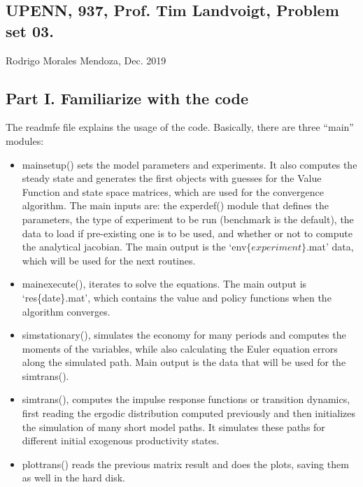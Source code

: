 \documentclass{article}
\begin{document}
\subsection*{UPENN, 937, Prof. Tim Landvoigt, Problem set 03.}

\begin{par}
Rodrigo Morales Mendoza, Dec. 2019
\end{par} \vspace{1em}


\subsection*{Part I. Familiarize with the code}

The readmfe file explains the usage of the code. Basically, there are three ``main'' modules:

\begin{itemize}
	\item main\textunderscore setup() sets the model parameters and experiments. It also computes the steady state and generates the first objects with guesses for the Value Function and state space matrices, which are used for the convergence algorithm. The main inputs are: the experdef() module that defines the parameters, the type of experiment to be run (benchmark is the default), the data to load if pre-existing one is to be used, and whether or not to compute the analytical jacobian. The main output is the `env\textunderscore$\{experiment\}$.mat' data, which will be used for the next routines. 
	\item main\textunderscore execute(), iterates to solve the equations. The main output is `res\textunderscore\{date\}.mat', which contains the value and policy functions when the algorithm converges.
	\item sim\textunderscore stationary(), simulates the economy for many periods and computes the moments of the variables, while also calculating the Euler equation errors along the simulated path. Main output is the data that will be used for the sim\textunderscore trans().
	\item sim\textunderscore trans(), computes the impulse response functions or transition dynamics, first reading the ergodic distribution computed previously and then initializes the simulation of many short model paths. It simulates these paths for different initial exogenous productivity states.
	\item plot\textunderscore trans() reads the previous matrix result and does the plots, saving them as well in the hard disk.
\end{itemize}
\end{document}
